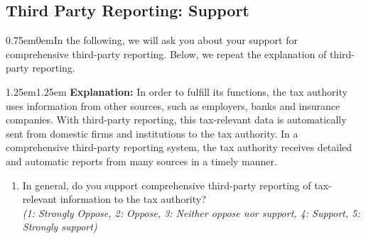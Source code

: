 \documentclass[11pt]{article}
\begin{document}
\subsection*{Third Party Reporting: Support}
\begin{adjustwidth}{0.75em}{0em}In the following, we will ask you about your support for comprehensive third-party reporting. Below, we repeat the explanation of third-party reporting.\end{adjustwidth}
\vspace{0.5em}
\begin{adjustwidth}{1.25em}{1.25em}  \textbf{Explanation:} In order to fulfill its functions, the tax authority uses information from other sources, such as employers, banks and insurance companies. With third-party reporting, this tax-relevant data is automatically sent from domestic firms and institutions to the tax authority. In a comprehensive third-party reporting system, the tax authority receives detailed and automatic reports from many sources in a timely manner.
\end{adjustwidth}
\begin{enumerate}[resume]
    \item In general, do you support comprehensive third-party reporting of tax-relevant information to the tax authority?  \\ \textit{(1: Strongly Oppose, 2: Oppose, 3: Neither oppose nor support, 4: Support, 5: Strongly support)}
\end{enumerate}
\end{document}

